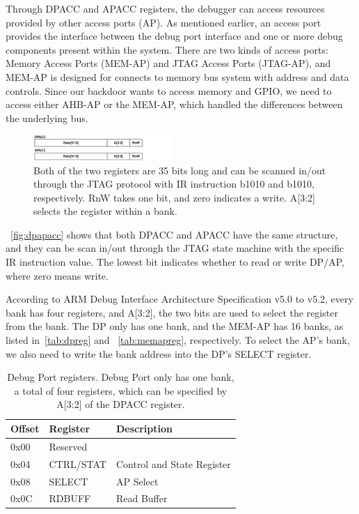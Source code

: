Through DPACC and APACC registers, the debugger can access resources provided by other access ports (AP).  As mentioned earlier, an access port provides the interface between the debug port interface and one or more debug components present within the system. There are two kinds of access ports: Memory Access Ports (MEM-AP) and JTAG Access Ports (JTAG-AP), and MEM-AP is designed for connects to memory bus system with address and data controls.  Since our backdoor wants to access memory and GPIO, we need to access either AHB-AP or the MEM-AP, which handled the differences between the underlying bus.



\begin{figure}[ht]
	\includegraphics[width=0.47\textwidth]{figures/dpapacc}
	\centering
	\caption{Both of the two registers are 35 bits long and can be scanned in/out through the JTAG protocol with IR instruction b1010 and b1010, respectively. RnW takes one bit, and zero indicates a write. A[3:2] selects the register within a bank.}
	\label{fig:dpapacc}
\end{figure}


~\autoref{fig:dpapacc} shows that both DPACC and APACC have the same structure, and they can be scan in/out through the JTAG state machine with the specific IR instruction value. The lowest bit indicates whether to read or write DP/AP, where zero means write.

 According to ARM Debug Interface Architecture Specification v5.0 to v5.2, every bank has four registers, and A[3:2], the two bits are used to select the register from the bank. The DP only has one bank, and the MEM-AP has 16 banks, as listed in~\autoref{tab:dpreg} and ~\autoref{tab:memapreg}, respectively. To select the AP's bank, we also need to write the bank address into the DP's SELECT register.




\begin{center}
	\begin{table}
		\begin{tabular}{l l l} 
			\hline
			Offset & Register &  Description  \\ 
			\hline
			0x00 & \multicolumn{2}{l}{Reserved} \\
			\hline
			0x04 & CTRL/STAT & Control and State Register \\
			\hline
			0x08 & SELECT & AP Select \\
			\hline
			0x0C & RDBUFF & Read Buffer\\
			\hline
		\end{tabular}
		\caption{Debug Port registers. Debug Port only has one bank, a total of four registers, which can be specified by A[3:2] of the DPACC register. }
		\label{tab:dpreg}
	\end{table}
\end{center}

